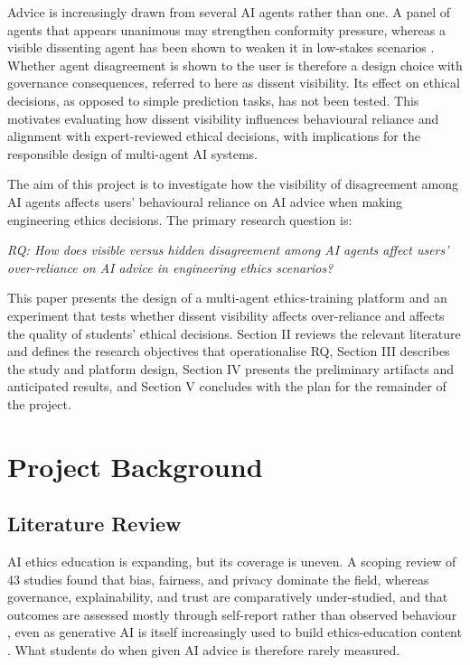 \documentclass[conference]{IEEEtran}
\begin{document}
Advice is increasingly drawn from several AI agents rather than one. A panel of agents that appears unanimous may strengthen conformity pressure, whereas a visible dissenting agent has been shown to weaken it in low-stakes scenarios \cite{tsuchiya2026multiaiadvice}. Whether agent disagreement is shown to the user is therefore a design choice with governance consequences, referred to here as dissent visibility. Its effect on ethical decisions, as opposed to simple prediction tasks, has not been tested. This motivates evaluating how dissent visibility influences behavioural reliance and alignment with expert-reviewed ethical decisions, with implications for the responsible design of multi-agent AI systems.

The aim of this project is to investigate how the visibility of disagreement among AI agents affects users' behavioural reliance on AI advice when making engineering ethics decisions. The primary research question is:

\textit{RQ: How does visible versus hidden disagreement among AI agents affect users' over-reliance on AI advice in engineering ethics scenarios?}

This paper presents the design of a multi-agent ethics-training platform and an experiment that tests whether dissent visibility affects over-reliance and affects the quality of students' ethical decisions. Section II reviews the relevant literature and defines the research objectives that operationalise RQ, Section III describes the study and platform design, Section IV presents the preliminary artifacts and anticipated results, and Section V concludes with the plan for the remainder of the project.
\section{Project Background}
\label{sec:oth_imp}

\subsection{Literature Review}
AI ethics education is expanding, but its coverage is uneven. A scoping review of 43 studies found that bias, fairness, and privacy dominate the field, whereas governance, explainability, and trust are comparatively under-studied, and that outcomes are assessed mostly through self-report rather than observed behaviour \cite{hillis2026aiethics}, even as generative AI is itself increasingly used to build ethics-education content \cite{grey2025ethicalreasoning}. What students do when given AI advice is therefore rarely measured.
\end{document}
